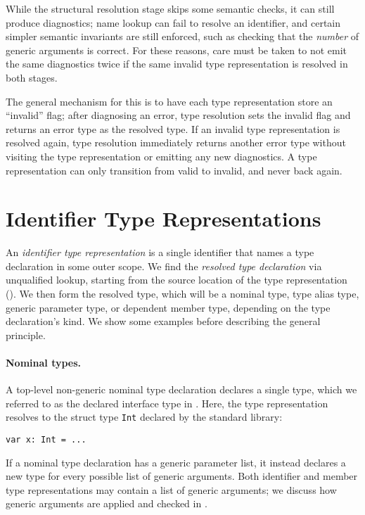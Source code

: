 \documentclass[../generics]{subfiles}
\begin{document}
While the structural resolution stage skips some semantic checks, it can still produce diagnostics; name lookup can fail to resolve an identifier, and certain simpler semantic invariants are still enforced, such as checking that the \emph{number} of generic arguments is correct. For these reasons, care must be taken to not emit the same diagnostics twice if the same invalid type representation is resolved in both stages.

The general mechanism for this is to have each type representation store an ``invalid'' flag; after diagnosing an error, type resolution sets the invalid flag and returns an error type as the resolved type. If an invalid type representation is resolved again, type resolution immediately returns another error type without visiting the type representation or emitting any new diagnostics. A type representation can only transition from valid to invalid, and never back again.

\section{Identifier Type Representations}\label{identtyperepr}

An \emph{identifier type representation} is a single identifier that names a type declaration in some outer scope. We find the \emph{resolved type declaration} via unqualified lookup, starting from the source location of the type representation (). We then form the resolved type, which will be a nominal type, type alias type, generic parameter type, or dependent member type, depending on the type declaration's kind. We show some examples before describing the general principle.

\paragraph{Nominal types.}
A top-level non-generic nominal type declaration declares a single type, which we referred to as the declared interface type in . Here, the type representation resolves to the struct type \texttt{Int} declared by the standard library:
\begin{Verbatim}
var x: Int = ...
\end{Verbatim}

If a nominal type declaration has a generic parameter list, it instead declares a new type for every possible list of generic arguments. Both identifier and member type representations may contain a list of generic arguments; we discuss how generic arguments are applied and checked in .
\end{document}
